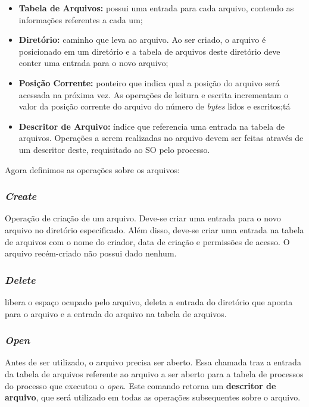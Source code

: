 \begin{itemize}
  \item \textbf{Tabela de Arquivos:} possui uma entrada para cada arquivo, contendo as informações referentes a cada um;

  \item \textbf{Diretório:} caminho que leva ao arquivo. Ao ser criado, o arquivo é posicionado em um diretório e a tabela de arquivos deste diretório deve conter uma entrada para o novo arquivo;

  \item \textbf{Posição Corrente:} ponteiro que indica qual a posição do arquivo será acessada na próxima vez. As operações de leitura e escrita incrementam o valor da posição corrente do arquivo do número de \textit{bytes} lidos e escritos;tá

  \item \textbf{Descritor de Arquivo:} índice que referencia uma entrada na tabela de arquivos. Operações a serem realizadas no arquivo devem ser feitas através de um descritor deste, requisitado ao SO pelo processo.
\end{itemize}


Agora definimos as operações sobre os arquivos:

\subsubsection{\textit{Create}}
Operação de criação de um arquivo. Deve-se criar uma entrada para o novo arquivo no diretório especificado. Além disso, deve-se criar uma entrada na tabela de arquivos com o nome do criador, data de criação e permissões de acesso. O arquivo recém-criado não possui dado nenhum.


\subsubsection{\textit{Delete}}
libera o espaço ocupado pelo arquivo, deleta a entrada do diretório que aponta para o arquivo e a entrada do arquivo na tabela de arquivos.


\subsubsection{\textit{Open}}
Antes de ser utilizado, o arquivo precisa ser aberto. Essa chamada traz a entrada da tabela de arquivos referente ao arquivo a ser aberto para a tabela de processos do processo que executou o \textit{open}. Este comando retorna um \textbf{descritor de arquivo}, que será utilizado em todas as operações subsequentes sobre o arquivo.


